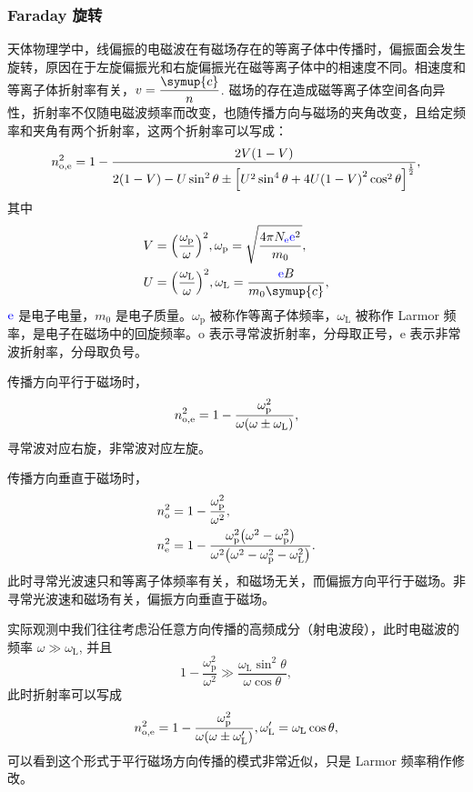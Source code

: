 \documentclass[../天体物理基础.tex]{subfiles}
\begin{document}
\subsubsection{Faraday 旋转}
天体物理学中，线偏振的电磁波在有磁场存在的等离子体中传播时，偏振面会发生旋转，原因在于左旋偏振光和右旋偏振光在磁等离子体中的相速度不同。相速度和等离子体折射率有关，$v=\dfrac{\symup{c}}{n}$. 磁场的存在造成磁等离子体空间各向异性，折射率不仅随电磁波频率而改变，也随传播方向与磁场的夹角改变，且给定频率和夹角有两个折射率，这两个折射率可以写成：
\begin{equation}
n^{2}_{\mathrm{o, e}}=1-\frac{2V\mleft(1-V\mright)}{2\mleft(1-V\mright)-U\sin^{2}{\theta}\pm\mleft[U^{2}\sin^{4}{\theta}+4U\mleft(1-V\mright)^{2}\cos^{2}{\theta}\mright]^{\frac{1}{2}}},
\end{equation}
其中
\begin{align}
V&=\mleft(\frac{\omega_{\mathrm{p}}}{\omega}\mright)^{2},\omega_{\mathrm{p}}=\sqrt{\frac{4\pi N_{{\color{blue}{\ce{e}}}}{\color{blue}{\ce{e}}}^{2}}{m_{0}}},\\
U&=\mleft(\frac{\omega_{\mathrm{L}}}{\omega}\mright)^{2},\omega_{\mathrm{L}}=\frac{{\color{blue}{\ce{e}}}B}{m_{0}\symup{c}},
\end{align}
${\color{blue}{\ce{e}}}$ 是电子电量，$m_{0}$ 是电子质量。$\omega_{\mathrm{p}}$ 被称作等离子体频率，$\omega_{\mathrm{L}}$ 被称作 Larmor 频率，是电子在磁场中的回旋频率。$\mathrm{o}$ 表示寻常波折射率，分母取正号，$\mathrm{e}$ 表示非常波折射率，分母取负号。

传播方向平行于磁场时，
\begin{equation}
n_{\mathrm{o, e}}^{2}=1-\frac{\omega_{\mathrm{p}}^{2}}{\omega\mleft(\omega\pm\omega_{\mathrm{L}}\mright)},
\end{equation}
寻常波对应右旋，非常波对应左旋。

传播方向垂直于磁场时，
\begin{align}
n_{\mathrm{o}}^{2}&=1-\frac{\omega^{2}_{\mathrm{p}}}{\omega^{2}},\\
n_{\mathrm{e}}^{2}&=1-\frac{\omega_{\mathrm{p}}^{2}\mleft(\omega^{2}-\omega_{\mathrm{p}}^{2}\mright)}{\omega^{2}\mleft(\omega^{2}-\omega_{\mathrm{p}}^{2}-\omega_{\mathrm{L}}^{2}\mright)}.
\end{align}
此时寻常光波速只和等离子体频率有关，和磁场无关，而偏振方向平行于磁场。非寻常光波速和磁场有关，偏振方向垂直于磁场。

实际观测中我们往往考虑沿任意方向传播的高频成分（射电波段），此时电磁波的频率 $\omega\gg\omega_{\mathrm{L}}$, 并且
\begin{equation}
1-\frac{\omega_{\mathrm{p}}^{2}}{\omega^{2}}\gg\frac{\omega_{\mathrm{L}}\sin^{2}{\theta}}{\omega\cos{\theta}},
\end{equation}
此时折射率可以写成
\begin{equation}
n^{2}_{\mathrm{o, e}}=1-\frac{\omega_{\mathrm{p}}^{2}}{\omega\mleft(\omega\pm\omega_{\mathrm{L}}'\mright)},\omega_{\mathrm{L}}'=\omega_{\mathrm{L}}\cos{\theta},\label{1.2.40}
\end{equation}
可以看到这个形式于平行磁场方向传播的模式非常近似，只是 Larmor 频率稍作修改。
\end{document}
